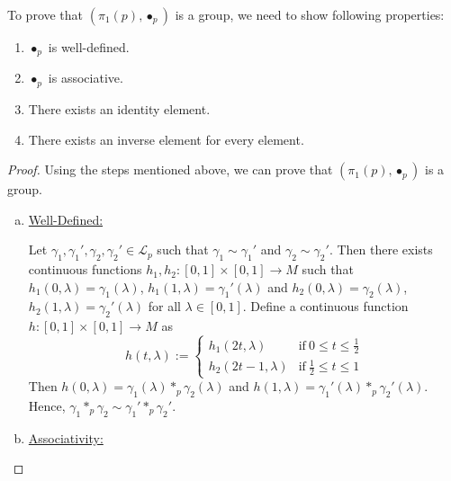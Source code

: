 \noindent To prove that \((\pi_1(p), \bullet_p)\) is a group, we need to show following properties:
\begin{enumerate}[nolistsep]
	\item \(\bullet_p\) is well-defined.
	\item \(\bullet_p\) is associative.
	\item There exists an identity element.
	\item There exists an inverse element for every element.
\end{enumerate}
\begin{proof}
	Using the steps mentioned above, we can prove that \((\pi_1(p), \bullet_p)\) is a group.
	\begin{enumerate}[(a)]
		\item \uline{Well-Defined:}

		      Let \(\gamma_1, \gamma_1', \gamma_2, \gamma_2' \in \mathscr{L}_p\) such that \(\gamma_1 \sim \gamma_1'\) and \(\gamma_2 \sim \gamma_2'\). Then there exists continuous functions \(h_1, h_2: [0, 1] \times [0, 1] \to M\) such that \(h_1(0, \lambda) = \gamma_1(\lambda)\), \(h_1(1, \lambda) = \gamma_1'(\lambda)\) and \(h_2(0, \lambda) = \gamma_2(\lambda)\), \(h_2(1, \lambda) = \gamma_2'(\lambda)\) for all \(\lambda \in [0, 1]\). Define a continuous function \(h: [0, 1] \times [0, 1] \to M\) as
		      \begin{equation}
			      h(t, \lambda) := \begin{cases}
				      h_1(2t, \lambda)     & \text{if}\ 0 \le t \le \frac{1}{2} \\
				      h_2(2t - 1, \lambda) & \text{if}\ \frac{1}{2} \le t \le 1
			      \end{cases}
		      \end{equation}
		      Then \(h(0, \lambda) = \gamma_1(\lambda) \ast_p \gamma_2(\lambda)\) and \(h(1, \lambda) = \gamma_1'(\lambda) \ast_p \gamma_2'(\lambda)\). Hence, \(\gamma_1 \ast_p \gamma_2 \sim \gamma_1' \ast_p \gamma_2'\).

		\item \uline{Associativity:}


\end{enumerate}
\end{proof}
